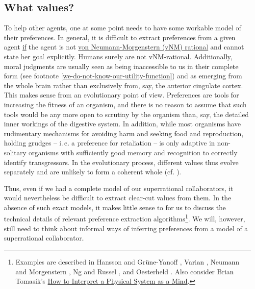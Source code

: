 \hypertarget{what-values}{\subsection{What values?}\label{what-values}}

To help other agents, one at some point needs to have some workable
model of their preferences. In general, it is difficult to extract
preferences from a given agent
\href{http://lesswrong.com/lw/h45/we_dont_have_a_utility_function/}{if}
the agent is not
\href{https://en.wikipedia.org/wiki/Von_Neumann\%E2\%80\%93Morgenstern_utility_theorem}{von
Neumann-Morgenstern (vNM) rational} and cannot state her goal
explicitly. Humans surely
\href{https://en.wikipedia.org/wiki/Cognitive_bias}{are not}
vNM-rational. Additionally, moral judgments are usually seen as being
inaccessible to us in their complete form (see footnote
\ref{we-do-not-know-our-utility-function}) and as emerging from the whole
brain rather than exclusively from, say, the anterior cingulate cortex.
This makes sense from an evolutionary point of view. Preferences are
tools for increasing the fitness of an organism, and there is no reason
to assume that such tools would be any more open to scrutiny by the
organism than, say, the detailed inner workings of the digestive system.
In addition, while most organisms have rudimentary mechanisms for
avoiding harm and seeking food and reproduction, holding grudges -- i.\,e.
a preference for retaliation -- is only adaptive in non-solitary
organisms with sufficiently good memory and recognition to correctly
identify transgressors. In the evolutionary process, different values
thus evolve separately and are unlikely to form a coherent whole (cf.
\cite{Dennett1991-es,Kurzban2012-vt}).

Thus, even if we had a complete model of our superrational
collaborators, it would nevertheless be difficult to extract clear-cut
values from them. In the absence of such exact models, it makes little
sense to for us to discuss the technical details of relevant preference
extraction algorithms\footnote{\label{fn:prefs} Examples are described in Hansson and Grüne-Yanoff
\citeyear{Hansson2012-um}, Varian \citeyear{Varian2006-vw}, Neumann and Morgenstern
\citeyear{Von_Neumann1953-mc}, Ng and Russel \citeyear{Ng2000-xw}, and Oesterheld
\citeyear{Oesterheld2016-bh}. Also consider Brian
    Tomasik's \href{http://reducing-suffering.org/interpret-physical-system-mind/}{How to Interpret
    a Physical System as a Mind}.}.  We will, however, still need to think about informal ways of
    inferring preferences from a model of a superrational collaborator.

